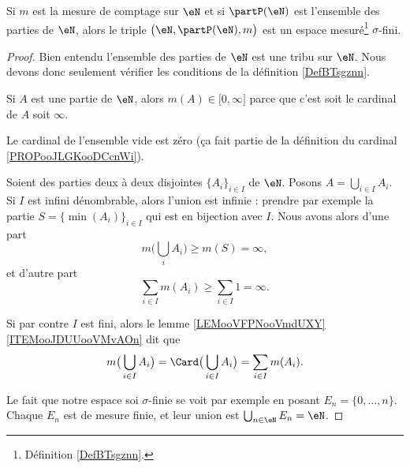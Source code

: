 \begin{lemma}       \label{LEMooDTFHooLVsvAw}
	Si \( m\) est la mesure de comptage sur \( \eN\) et si \( \partP(\eN)\) est l'ensemble des parties de \( \eN\), alors le triple \( \big( \eN,\partP(\eN), m \big)\) est un espace mesuré\footnote{Définition \ref{DefBTsgznn}.} \( \sigma\)-fini.

\end{lemma}

\begin{proof}
	Bien entendu l'ensemble des parties de \( \eN\) est une tribu sur \( \eN\). Nous devons donc seulement vérifier les conditions de la définition \ref{DefBTsgznn}.

	Si \( A\) est une partie de \( \eN\), alors \( m(A)\in \mathopen[ 0 , \infty \mathclose]\) parce que c'est soit le cardinal de \( A\) soit \( \infty\).

	Le cardinal de l'ensemble vide est zéro (ça fait partie de la définition du cardinal \ref{PROPooJLGKooDCcnWi}).

	Soient des parties deux à deux disjointes \( \{ A_i \}_{i\in I}\) de \( \eN\). Posons \( A=\bigcup_{i\in I}A_i\). Si \( I\) est infini dénombrable, alors l'union est infinie : prendre par exemple la partie \( S=\{ \min(A_i) \}_{i\in I}\) qui est en bijection avec \( I\). Nous avons alors d'une part
	\begin{equation}
		m\big( \bigcup_iA_i \big)\geq m(S)=\infty,
	\end{equation}
	et d'autre part
	\begin{equation}
		\sum_{i\in I}m(A_i)\geq \sum_{i\in I}1=\infty.
	\end{equation}

	Si par contre \( I\) est fini, alors le lemme \ref{LEMooVFPNooVmdUXY}\ref{ITEMooJDUUooVMvAOn} dit que
	\begin{equation}
		m\big( \bigcup_{i\in I}A_i \big)=\Card\big( \bigcup_{i\in I}A_i \big)=\sum_{i\in I}m(A_i).
	\end{equation}

	Le fait que notre espace soi \( \sigma\)-finie se voit par exemple en posant \( E_n=\{ 0,\ldots, n \}\). Chaque \( E_n\) est de mesure finie, et leur union est \( \bigcup_{n\in \eN}E_n=\eN\).
\end{proof}


